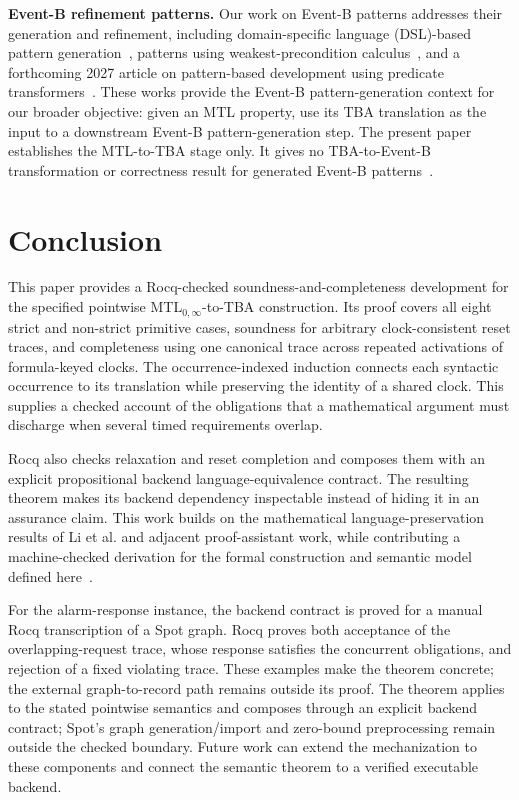 \documentclass{ieeeaccess}
\newcommand{\runinhead}[1]{\par\noindent\textbf{#1}\enspace}
\begin{document}
\runinhead{Event-B refinement patterns.}
Our work on Event-B patterns addresses their generation and refinement,
including domain-specific language (DSL)-based pattern generation~\cite{fares_abz23}, patterns using
weakest-precondition calculus~\cite{fares_facs24}, and a forthcoming 2027
article on pattern-based development using predicate transformers~\cite{fares_scp27}. These works
provide the Event-B pattern-generation context for our broader objective:
given an MTL property, use its TBA translation as the input to a downstream
Event-B pattern-generation step. The present paper establishes the MTL-to-TBA
stage only. It gives no TBA-to-Event-B transformation or correctness result
for generated Event-B patterns~\cite{openai_codex}.

\section{Conclusion}
This paper provides a Rocq-checked soundness-and-completeness development for
the specified pointwise MTL$_{0,\infty}$-to-TBA construction. Its proof covers
all eight strict and non-strict primitive cases, soundness for arbitrary
clock-consistent reset traces, and completeness using one canonical trace
across repeated activations of formula-keyed clocks. The occurrence-indexed
induction connects each syntactic occurrence to its translation while
preserving the identity of a shared clock. This supplies a checked account of
the obligations that a mathematical argument must discharge when several
timed requirements overlap.

Rocq also checks relaxation and reset completion and composes them with an
explicit propositional backend language-equivalence contract. The resulting
theorem makes its backend dependency inspectable instead of hiding it in an
assurance claim. This work builds on the mathematical language-preservation
results of Li et al. and adjacent proof-assistant work, while contributing a
machine-checked derivation for the formal construction and semantic model
defined here~\cite{li_spin7,xu08,roohi_viswanathan_vmcai18}.

For the alarm-response instance, the backend contract is proved for a manual
Rocq transcription of a Spot graph. Rocq proves both acceptance of the
overlapping-request trace, whose response satisfies the concurrent
obligations, and rejection of a fixed violating trace. These examples make
the theorem concrete; the external graph-to-record path remains outside its
proof. The theorem applies to the stated pointwise semantics and composes
through an explicit backend contract; Spot's graph generation/import and
zero-bound preprocessing remain outside the checked boundary. Future work
can extend the mechanization to these components and connect the semantic
theorem to a verified executable backend.
\end{document}
